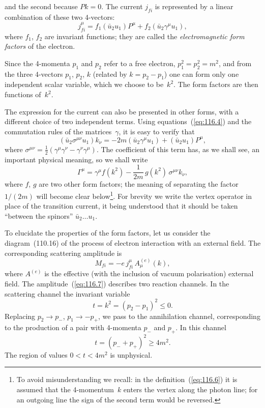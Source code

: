 
\noindent and the second because $Pk = 0$. The current $j_{fi}$ is represented by a linear combination of these two 4-vectors:
\[
j_{fi}^\mu = f_1(\bar{u}_2 u_1)P^\mu + f_2(\bar{u}_2\gamma^\mu u_1),
\]
where $f_1$, $f_2$ are invariant functions; they are called the \emph{electromagnetic form factors} of the electron.

Since the 4-momenta $p_1$ and $p_2$ refer to a free electron, $p_1^2 = p_2^2 = m^2$, and from the three 4-vectors $p_1$, $p_2$, $k$ (related by $k = p_2 - p_1$) one can form only one independent scalar variable, which we choose to be~$k^2$. The form factors are then functions of~$k^2$.

The expression for the current can also be presented in other forms, with a different choice of two independent terms. Using equations~(\ref{eq:116.4}) and the commutation rules of the matrices~$\gamma$, it is easy to verify that
\begin{equation}
(\bar{u}_2\sigma^{\mu\nu}u_1)k_\nu = -2m(\bar{u}_2\gamma^\mu u_1) + (\bar{u}_2 u_1)P^\mu,
\label{eq:116.5}
\end{equation}
where $\sigma^{\mu\nu} = \tfrac{1}{2}(\gamma^\mu\gamma^\nu - \gamma^\nu\gamma^\mu)$. The coefficient of this term has, as we shall see, an important physical meaning, so we shall write
\begin{equation}
\Gamma^\mu = \gamma^\mu f(k^2) - \frac{1}{2m}\,g(k^2)\,\sigma^{\mu\nu}k_\nu,
\label{eq:116.6}
\end{equation}
where $f$, $g$ are two other form factors; the meaning of separating the factor $1/(2m)$ will become clear below\footnote{To avoid misunderstanding we recall: in the definition~(\ref{eq:116.6}) it is assumed that the 4-momentum~$k$ enters the vertex along the photon line; for an outgoing line the sign of the second term would be reversed.}. For brevity we write the vertex operator in place of the transition current, it being understood that it should be taken ``between the spinors'' $\bar{u}_2 \ldots u_1$.

To elucidate the properties of the form factors, let us consider the diagram~(110.16) of the process of electron interaction with an external field. The corresponding scattering amplitude is
\begin{equation}
M_{fi} = -e\,j_{fi}^\mu\,A_\mu^{(e)}(k),
\label{eq:116.7}
\end{equation}
where $A^{(e)}$ is the effective (with the inclusion of vacuum polarisation) external field. The amplitude~(\ref{eq:116.7}) describes two reaction channels. In the scattering channel the invariant variable
\[
t = k^2 = (p_2 - p_1)^2 \leqslant 0.
\]
Replacing $p_2 \to p_-$, $p_1 \to -p_+$, we pass to the annihilation channel, corresponding to the production of a pair with 4-momenta $p_-$ and $p_+$. In this channel
\[
t = (p_- + p_+)^2 \geqslant 4m^2.
\]
The region of values $0 < t < 4m^2$ is unphysical.

